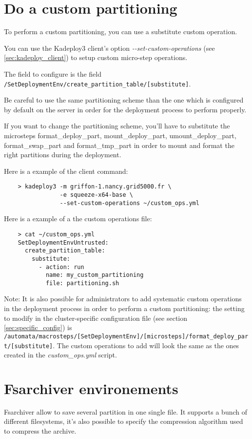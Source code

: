 \documentclass[a4wide,10pt,oneside]{book}
\newcommand{\ypath}[1]{\texttt{#1}}
\begin{document}
\section{Do a custom partitioning}\label{sec:custom-partitioning}
To perform a custom partitioning, you can use a substitute custom operation.

You can use the Kadeploy3 client's option \emph{-{}-set-custom-operations} (see \ref{sec:kadeploy_client}) to setup custom micro-step operations.

The field to configure is the field \ypath{/SetDeploymentEnv/create\_partition\_table/[substitute]}.

Be careful to use the same partitioning scheme than the one which is configured by default on the server in order for the deployment process to perform properly.

If you want to change the partitioning scheme, you'll have to substitute the microsteps format\_deploy\_part, mount\_deploy\_part, umount\_deploy\_part, format\_swap\_part and format\_tmp\_part in order to mount and format the right partitions during the deployment.

Here is a example of the client command:
\begin{verbatim}
    > kadeploy3 -m griffon-1.nancy.grid5000.fr \
                -e squeeze-x64-base \
                --set-custom-operations ~/custom_ops.yml
\end{verbatim}

Here is a example of a the custom operations file:
\begin{small}
\begin{verbatim}
    > cat ~/custom_ops.yml
    SetDeploymentEnvUntrusted:
      create_partition_table:
        substitute:
          - action: run
            name: my_custom_partitioning
            file: partitioning.sh
\end{verbatim}
\end{small}

Note: It is also possible for administrators to add systematic custom operations in the deployment process in order to perform a custom partitioning: the setting to modify in the cluster-specific configuration file (see section \ref{sec:specific_config}) is \ypath{/automata/macrosteps/[SetDeploymentEnv]/[microsteps]/format\_deploy\_part/[substitute]}. The custom operations to add will look the same as the ones created in the \emph{custom\_ops.yml} script.


\section{Fsarchiver environements}\label{sec:fsa}
Fsarchiver allow to save several partition in one single file. It supports a bunch of different filesystems, it's also possible to specify the compression algorithm used to compress the archive.
\end{document}
